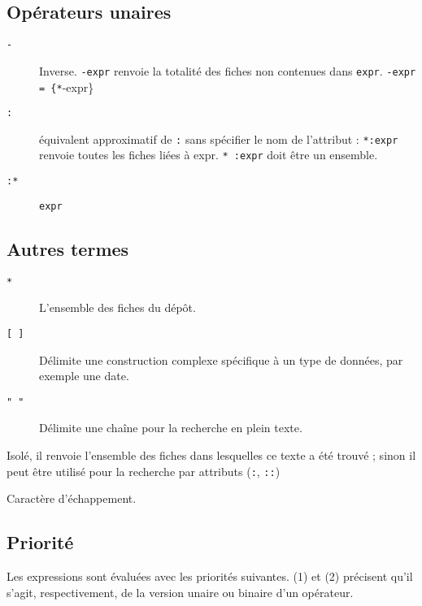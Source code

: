 \documentclass[11pt]{article}
\begin{document}
\subsection{Opérateurs unaires}\label{opuxe9rateurs-unaires}

\begin{description}
\item[\texttt{-}]
Inverse. \texttt{-expr} renvoie la totalité des fiches non contenues
dans \texttt{expr}. \texttt{-expr = \{*}-expr\}
\item[\texttt{:}]
équivalent approximatif de \texttt{:} sans spécifier le nom de
l'attribut : \texttt{*:expr} renvoie toutes les fiches liées à expr.
\texttt{* :expr} doit être un ensemble.
\item[\texttt{:*}]
\texttt{expr}
\end{description}

\subsection{Autres termes}\label{autres-termes}

\begin{description}
\item[\texttt{*}]
L'ensemble des fiches du dépôt.
\item[\texttt{{[} {]}}]
Délimite une construction complexe spécifique à un type de données, par
exemple une date.
\item[\texttt{" "}]
Délimite une chaîne pour la recherche en plein texte.
\end{description}

Isolé, il renvoie l'ensemble des fiches dans lesquelles ce texte a été
trouvé ; sinon il peut être utilisé pour la recherche par attributs
(\texttt{:}, \texttt{::})

\begin{description}
\itemsep1pt\parskip0pt
\item[\texttt{\textbackslash{}}]
Caractère d'échappement.
\end{description}

\subsection{Priorité}\label{OperateursPriorite}

Les expressions sont évaluées avec les priorités suivantes. (1) et (2)
précisent qu'il s'agit, respectivement, de la version unaire ou binaire
d'un opérateur.
\end{document}
